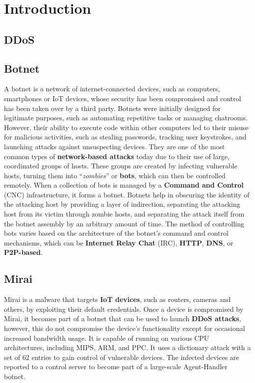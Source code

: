 \chapter{Introduction}

\section{DDoS}

\section{Botnet}

A botnet is a network of internet-connected devices, such as computers, smartphones or IoT devices, whose security has been compromised and control has been taken over by a third party. 
Botnets were initially designed for legitimate purposes, such as automating repetitive tasks or managing chatrooms. However, their ability to execute code within other computers led to their misuse for malicious activities, such as stealing passwords, tracking user keystrokes, and launching attacks against unsuspecting devices. \cite{fortinet-botnet} They are one of the most common types of \textbf{network-based attacks} today due to their use of large, coordinated groups of hosts. These groups are created by infecting vulnerable hosts,  turning them into ``\textit{zombies}'' or \textbf{bots}, which can then be controlled remotely. When a collection of bots is managed by a \textbf{Command and Control} (CNC) infrastructure, it forms a botnet. Botnets help in obscuring the identity of the attacking host by providing a layer of indirection, separating the attacking host from its victim through zombie hosts, and separating the attack itself from the botnet assembly by an arbitrary amount of time. \cite{strayer2008botnet} The method of controlling bots varies based on the architecture of the botnet's command and control mechanisms, which can be \textbf{Internet Relay Chat} (IRC), \textbf{HTTP}, \textbf{DNS}, or \textbf{P2P-based}. 

\section{Mirai}

Mirai is a malware that targets \textbf{IoT devices}, such as routers, cameras and others, by exploiting their default credentials. Once a device is compromised by Mirai, it becomes part of a botnet that can be used to launch \textbf{DDoS attacks}, however, this do not compromise the device's functionality except for occasional increased bandwidth usage. It is capable of running on various CPU architectures, including MIPS, ARM, and PPC. It uses a dictionary attack with a set of 62 entries to gain control of vulnerable devices. The infected devices are reported to a control server to become part of a large-scale Agent-Handler botnet. \cite{de2018ddos}

